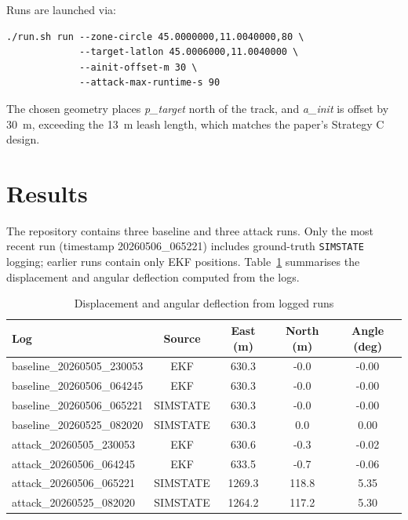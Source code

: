 \documentclass[12pt, a4paper]{article}
\begin{document}
Runs are launched via:

\begin{verbatim}
./run.sh run --zone-circle 45.0000000,11.0040000,80 \
             --target-latlon 45.0006000,11.0040000 \
             --ainit-offset-m 30 \
             --attack-max-runtime-s 90
\end{verbatim}

The chosen geometry places \textit{p\_target} north of the track, and \textit{a\_init} is offset by 30~m, exceeding the 13~m leash length, which matches the paper's Strategy C design.

\section{Results}

The repository contains three baseline and three attack runs. Only the most recent run (timestamp 20260506\_065221) includes ground-truth \texttt{SIMSTATE} logging; earlier runs contain only EKF positions. Table~\ref{tab:results} summarises the displacement and angular deflection computed from the logs.

\begin{table}[H]
  \centering
  \begin{tabularx}{\textwidth}{lcccc}
    \toprule
    \textbf{Log} & \textbf{Source} & \textbf{East (m)} & \textbf{North (m)} & \textbf{Angle (deg)} \\
    \midrule
    baseline\_20260505\_230053 & EKF & 630.3 & -0.0 & -0.00 \\
    baseline\_20260506\_064245 & EKF & 630.3 & -0.0 & -0.00 \\
    baseline\_20260506\_065221 & SIMSTATE & 630.3 & -0.0 & -0.00 \\
    baseline\_20260525\_082020 & SIMSTATE & 630.3 & 0.0 & 0.00 \\
    attack\_20260505\_230053 & EKF & 630.6 & -0.3 & -0.02 \\
    attack\_20260506\_064245 & EKF & 633.5 & -0.7 & -0.06 \\
    attack\_20260506\_065221 & SIMSTATE & 1269.3 & 118.8 & 5.35 \\
    attack\_20260525\_082020 & SIMSTATE & 1264.2 & 117.2 & 5.30 \\
    \bottomrule
  \end{tabularx}
  \caption{Displacement and angular deflection from logged runs}
  \label{tab:results}
\end{table}
\end{document}
